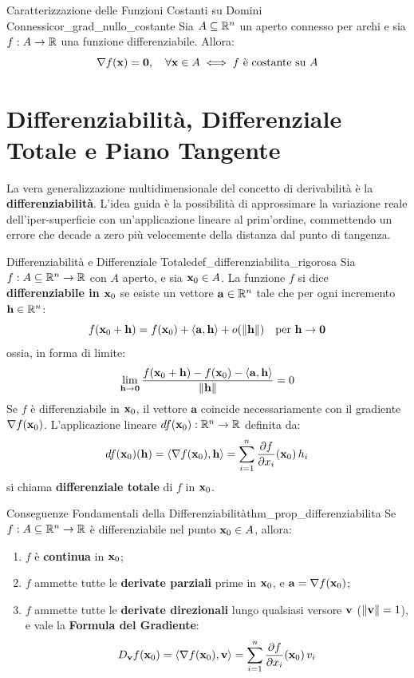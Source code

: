 \begin{corollario}{Caratterizzazione delle Funzioni Costanti su Domini Connessi}{cor_grad_nullo_costante}
Sia $A \subseteq \mathbb{R}^n$ un aperto connesso per archi e sia $f: A \to \mathbb{R}$ una funzione differenziabile. Allora:
\[
\nabla f(\mathbf{x}) = \mathbf{0}, \quad \forall \mathbf{x} \in A \iff f \text{ è costante su } A
\]
\end{corollario}

\section{Differenziabilità, Differenziale Totale e Piano Tangente}

La vera generalizzazione multidimensionale del concetto di derivabilità è la \textbf{differenziabilità}. L'idea guida è la possibilità di approssimare la variazione reale dell'iper-superficie con un'applicazione lineare al prim'ordine, commettendo un errore che decade a zero più velocemente della distanza dal punto di tangenza.

\begin{definizione}{Differenziabilità e Differenziale Totale}{def_differenziabilita_rigorosa}
Sia $f: A \subseteq \mathbb{R}^n \to \mathbb{R}$ con $A$ aperto, e sia $\mathbf{x}_0 \in A$. La funzione $f$ si dice \textbf{differenziabile in $\mathbf{x}_0$} se esiste un vettore $\mathbf{a} \in \mathbb{R}^n$ tale che per ogni incremento $\mathbf{h} \in \mathbb{R}^n$:
\[
f(\mathbf{x}_0 + \mathbf{h}) = f(\mathbf{x}_0) + \langle\mathbf{a}, \mathbf{h}\rangle + o(\lVert\mathbf{h}\rVert) \quad \text{per } \mathbf{h} \to \mathbf{0}
\]
ossia, in forma di limite:
\[
\lim_{\mathbf{h} \to \mathbf{0}} \frac{f(\mathbf{x}_0 + \mathbf{h}) - f(\mathbf{x}_0) - \langle\mathbf{a}, \mathbf{h}\rangle}{\lVert\mathbf{h}\rVert} = 0
\]
Se $f$ è differenziabile in $\mathbf{x}_0$, il vettore $\mathbf{a}$ coincide necessariamente con il gradiente $\nabla f(\mathbf{x}_0)$.
L'applicazione lineare $df(\mathbf{x}_0): \mathbb{R}^n \to \mathbb{R}$ definita da:
\[
df(\mathbf{x}_0)(\mathbf{h}) = \langle\nabla f(\mathbf{x}_0), \mathbf{h}\rangle = \sum_{i=1}^n \frac{\partial f}{\partial x_i}(\mathbf{x}_0) \, h_i
\]
si chiama \textbf{differenziale totale} di $f$ in $\mathbf{x}_0$.
\end{definizione}

\begin{teorema}{Conseguenze Fondamentali della Differenziabilità}{thm_prop_differenziabilita}
Se $f: A \subseteq \mathbb{R}^n \to \mathbb{R}$ è differenziabile nel punto $\mathbf{x}_0 \in A$, allora:
\begin{enumerate}
    \item $f$ è \textbf{continua} in $\mathbf{x}_0$;
    \item $f$ ammette tutte le \textbf{derivate parziali} prime in $\mathbf{x}_0$, e $\mathbf{a} = \nabla f(\mathbf{x}_0)$;
    \item $f$ ammette tutte le \textbf{derivate direzionali} lungo qualsiasi versore $\mathbf{v}$ ($\lVert\mathbf{v}\rVert=1$), e vale la \textbf{Formula del Gradiente}:
    \[
    D_{\mathbf{v}} f(\mathbf{x}_0) = \langle\nabla f(\mathbf{x}_0), \mathbf{v}\rangle = \sum_{i=1}^n \frac{\partial f}{\partial x_i}(\mathbf{x}_0) \, v_i
    \]
\end{enumerate}
\end{teorema}


